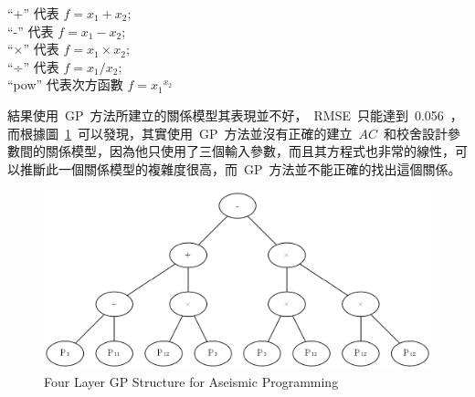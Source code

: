 ``+'' 代表 $f = x_1 + x_2$; \\ \indent
``-'' 代表 $f = x_1 - x_2$; \\ \indent
``×'' 代表 $f = x_1 \times x_2$; \\ \indent
``÷'' 代表 $f = x_1 / x_2$; \\ \indent
``pow'' 代表次方函數 $f = {x_1} ^ {x_2}$

結果使用~GP~方法所建立的關係模型其表現並不好，~RMSE~只能達到~0.056~，而根據圖~\ref{fig:4LGP}~可以發現，其實使用~GP~方法並沒有正確的建立~$AC$~和校舍設計參數間的關係模型，因為他只使用了三個輸入參數，而且其方程式也非常的線性，可以推斷此一個關係模型的複雜度很高，而~GP~方法並不能正確的找出這個關係。

\begin{figure}[hbtp]
  \begin{center}
    \includegraphics[width=1.0\textwidth]{figures/4-layer-gp.png}
    \caption{Four Layer GP Structure for Aseismic Programming} 
    \label{fig:4LGP}
  \end{center}
\end{figure}


